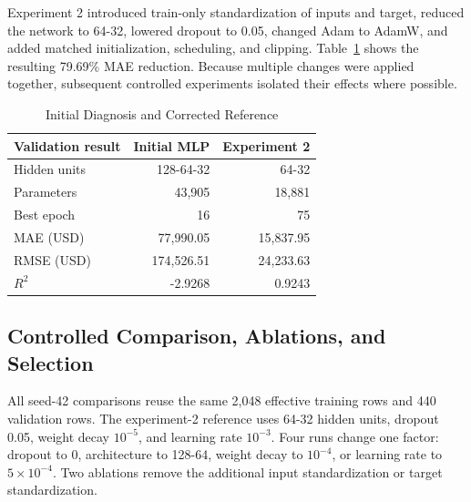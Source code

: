 \documentclass[11pt,a4paper]{article}
\begin{document}
Experiment 2 introduced train-only standardization of inputs and target, reduced the network to 64-32, lowered dropout to 0.05, changed Adam to AdamW, and added matched initialization, scheduling, and clipping. Table~\ref{tab:initial} shows the resulting 79.69\% MAE reduction. Because multiple changes were applied together, subsequent controlled experiments isolated their effects where possible.

\begin{table}[htbp]
\caption{Initial Diagnosis and Corrected Reference}
\label{tab:initial}
\centering
\small
\begin{tabular}{lrr}
\toprule
Validation result & Initial MLP & Experiment 2 \\
\midrule
Hidden units & 128-64-32 & 64-32 \\
Parameters & 43,905 & 18,881 \\
Best epoch & 16 & 75 \\
MAE (USD) & 77,990.05 & 15,837.95 \\
RMSE (USD) & 174,526.51 & 24,233.63 \\
$R^2$ & -2.9268 & 0.9243 \\
\bottomrule
\end{tabular}
\end{table}

\subsection{Controlled Comparison, Ablations, and Selection}
All seed-42 comparisons reuse the same 2,048 effective training rows and 440 validation rows. The experiment-2 reference uses 64-32 hidden units, dropout 0.05, weight decay $10^{-5}$, and learning rate $10^{-3}$. Four runs change one factor: dropout to 0, architecture to 128-64, weight decay to $10^{-4}$, or learning rate to $5\times10^{-4}$. Two ablations remove the additional input standardization or target standardization.
\end{document}

